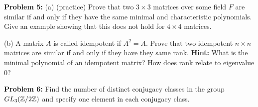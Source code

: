 \documentclass[12pt]{article}
\begin{document}
\skv
{\bf Problem 5: } \rm (a) (practice) Prove that two $3\times 3$ matrices
over some field $F$ are similar if and only if they have the same minimal and characteristic 
polynomials. Give an example showing that this does not hold for $4\times 4$ matrices.

(b) A matrix $A$ is called idempotent if $A^2=A$. Prove that two idempotent $n\times n$ matrices are similar if and only if they have they same rank. {\bf Hint:} What is the minimal polynomial of an idempotent matrix? How does rank relate to eigenvalue $0$?

\skv
{\bf Problem 6: } Find the number of distinct conjugacy classes in the group $GL_3({\mathbb Z}/2{\mathbb Z})$
and specify one element in each conjugacy class.
\end{document}

